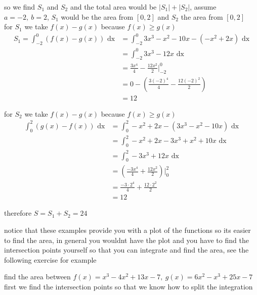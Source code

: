 \documentclass[a4paper,12pt]{article}
\newcommand{\?}{\stackrel{?}{=}}
\begin{document}
\begin{definition}
\begin{my_example}
so we find \(S_1\) and \(S_2\) and the total area would be \(|S_1| + |S_2|\), assume \(a=-2,\ b=2\), \(S_1\) would be the area from \([0,2]\) and \(S_2\) the area from \([0,2]\)\\[0pt]

for \(S_1\) we take \(f(x) - g(x)\) because \(f(x) \geq g(x)\)\\[0pt]

\begin{align*}
  S_1 = \int_{-2}^0 (f(x) - g(x)) \text{ dx} &= \int_{-2}^0 3x^3-x^2-10x-(-x^2+2x) \text{ dx}\\
  &= \int_{-2}^0 3x^3-12x \text{ dx}\\
  &= \frac{3x^4}{4}-\frac{12x^2}{2} \Big|_{-2}^0\\
  &= 0 - \left(\frac{3(-2)^4}{4}-\frac{12(-2)^2}{2}\right)\\  
  &= 12
\end{align*}

for \(S_2\) we take \(f(x) - g(x)\) because \(f(x) \geq g(x)\)\\[0pt]

\begin{align*}
  \int_0^2 (g(x)-f(x)) \text{ dx} &= \int_0^2 -x^2+2x-(3x^3-x^2-10x) \text{ dx}\\
  &= \int_0^2 -x^2+2x-3x^3+x^2+10x \text{ dx}\\
  &= \int_0^2 -3x^3+12x \text{ dx}\\
  &= \left(\frac{-3x^4}{4} + \frac{12x^2}{2}\right) \Big|_0^2\\
  &= \frac{-3 \cdot 2^4}{4} + \frac{12 \cdot 2^2}{2}\\
  &= 12
\end{align*}

therefore \(S = S_1 + S_2 = 24\)\\[0pt]
\end{my_example}

\begin{note}
notice that these examples provide you with a plot of the functions so its easier to find the area, in general you wouldnt have the plot and you have to find the intersection points yourself so that you can integrate and find the area, see the following exercise for example\\[0pt]
\end{note}

\begin{my_example}
find the area between \(f(x)=x^3-4x^2+13x-7,\ g(x)=6x^2-x^3+25x-7\)\\[0pt]
first we find the intersection points so that we know how to split the integration\\[0pt]


\end{my_example}
\end{definition}
\end{document}
